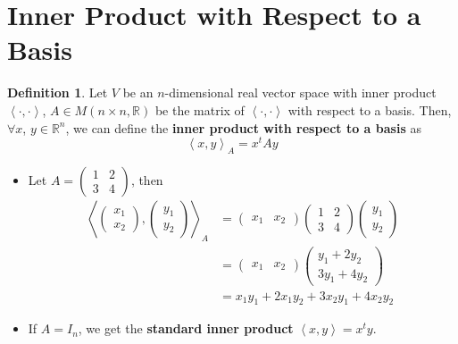 \documentclass[letterpaper,12pt]{article}
\theoremstyle{definition}
\newtheorem*{definition}{Definition}
\newcommand{\inp}[2]{\left< #1, #2 \right>}
\begin{document}
\section*{Inner Product with Respect to a Basis}
\begin{definition}
Let $V$ be an $n$-dimensional real vector space with inner product $\inp{\cdot}{\cdot}$, $A \in M(n \times n, \mathbb{R})$ be the matrix of $\inp{\cdot}{\cdot}$ with respect to a basis. Then, $\forall x$, $y \in \mathbb{R}^n$, we can define the \textbf{inner product with respect to a basis} as
\begin{equation*}
    \inp{x}{y}_{A} = x^t A y
\end{equation*}
\end{definition}
\begin{itemize}
    \item Let $A = \begin{pmatrix} 1 & 2 \\ 3 & 4 \end{pmatrix}$, then
    \begin{align*}
        \inp{\begin{pmatrix} x_1 \\ x_2 \end{pmatrix}}{\begin{pmatrix} y_1 \\ y_2 \end{pmatrix}}_{A} & = \begin{pmatrix} x_1 & x_2 \end{pmatrix} \begin{pmatrix} 1 & 2 \\ 3 & 4 \end{pmatrix} \begin{pmatrix} y_1 \\ y_2 \end{pmatrix} \\
        & = \begin{pmatrix} x_1 & x_2 \end{pmatrix} \begin{pmatrix} y_1 + 2y_2 \\ 3y_1 + 4y_2 \end{pmatrix} \\
        & = x_1 y_1 + 2x_1 y_2 + 3x_2 y_1 + 4x_2 y_2
    \end{align*}
    \item If $A = I_n$, we get the \textbf{standard inner product} $\inp{x}{y} = x^t y$.
\end{itemize}
\end{document}
